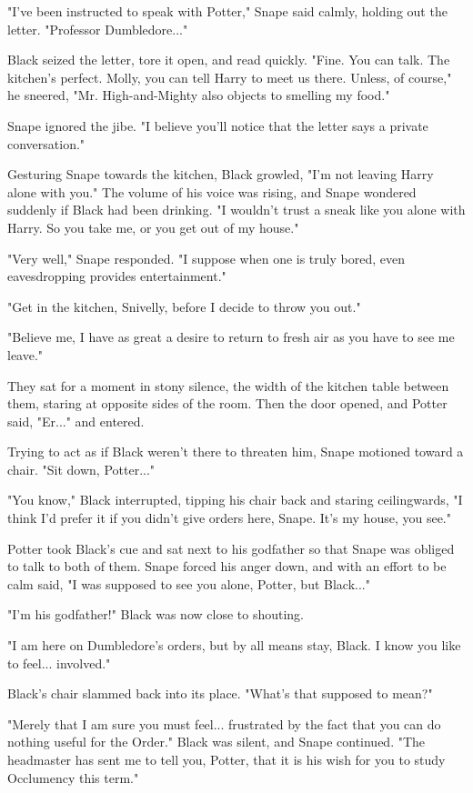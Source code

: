 "I've been instructed to speak with Potter," Snape said calmly, holding out the letter. "Professor Dumbledore..."

Black seized the letter, tore it open, and read quickly. "Fine. You can talk. The kitchen's perfect. Molly, you can tell Harry to meet us there. Unless, of course," he sneered, "Mr. High-and-Mighty also objects to smelling my food."

Snape ignored the jibe. "I believe you'll notice that the letter says a private conversation."

Gesturing Snape towards the kitchen, Black growled, "I'm not leaving Harry alone with you." The volume of his voice was rising, and Snape wondered suddenly if Black had been drinking. "I wouldn't trust a sneak like you alone with Harry. So you take me, or you get out of my house."

"Very well," Snape responded. "I suppose when one is truly bored, even eavesdropping provides entertainment."

"Get in the kitchen, Snivelly, before I decide to throw you out."

"Believe me, I have as great a desire to return to fresh air as you have to see me leave."

They sat for a moment in stony silence, the width of the kitchen table between them, staring at opposite sides of the room. Then the door opened, and Potter said, "Er..." and entered.

Trying to act as if Black weren't there to threaten him, Snape motioned toward a chair. "Sit down, Potter..."

"You know," Black interrupted, tipping his chair back and staring ceilingwards, "I think I'd prefer it if you didn't give orders here, Snape. It's my house, you see."

Potter took Black's cue and sat next to his godfather so that Snape was obliged to talk to both of them. Snape forced his anger down, and with an effort to be calm said, "I was supposed to see you alone, Potter, but Black..."

"I'm his godfather!" Black was now close to shouting.

"I am here on Dumbledore's orders, but by all means stay, Black. I know you like to feel... involved."

Black's chair slammed back into its place. "What's that supposed to mean?"

"Merely that I am sure you must feel... frustrated by the fact that you can do nothing useful for the Order." Black was silent, and Snape continued. "The headmaster has sent me to tell you, Potter, that it is his wish for you to study Occlumency this term."

